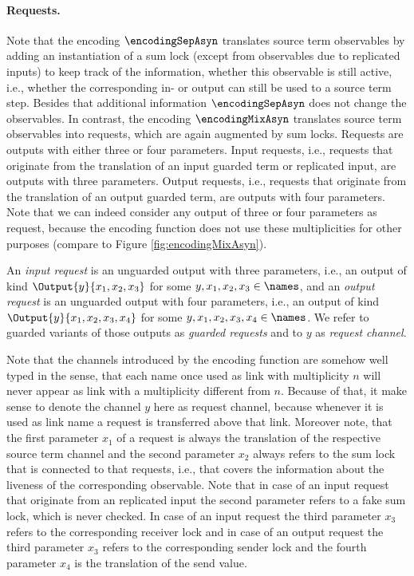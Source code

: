 \documentclass[]{llncs}
\begin{document}
\paragraph*{Requests.} Note that the encoding $ \encodingSepAsyn $ translates source term observables by adding an instantiation of a sum lock (except from observables due to replicated inputs) to keep track of the information, whether this observable is still active, i.e., whether the corresponding in- or output can still be used to \simulate a source term step. Besides that additional information $ \encodingSepAsyn $ does not change the observables. In contrast, the encoding $ \encodingMixAsyn $ translates source term observables into requests, which are again augmented by sum locks. Requests are outputs with either three or four parameters. Input requests, i.e., requests that originate from the translation of an input guarded term or replicated input, are outputs with three parameters. Output requests, i.e., requests that originate from the translation of an output guarded term, are outputs with four parameters. Note that we can indeed consider any output of three or four parameters as request, because the encoding function does not use these multiplicities for other purposes (compare to Figure \ref{fig:encodingMixAsyn}).

\begin{definition}[Request] \label{def:request}
	An \emph{input request} is an unguarded output with three parameters, i.e., an output of kind $ \Output{y}{x_1, x_2, x_3} $ for some $ y, x_1, x_2, x_3 \in \names $, and an \emph{output request} is an unguarded output with four parameters, i.e., an output of kind $ \Output{y}{x_1, x_2, x_3, x_4} $ for some $ y, x_1, x_2, x_3, x_4 \in \names $. We refer to guarded variants of those outputs as \emph{guarded requests} and to $ y $ as \emph{request channel}.
\end{definition}
\noindent
Note that the channels introduced by the encoding function are somehow well typed in the sense, that each name once used as link with multiplicity $ n $ will never appear as link with a multiplicity different from $ n $. Because of that, it make sense to denote the channel $ y $ here as request channel, because whenever it is used as link name a request is transferred above that link. Moreover note, that the first parameter $ x_1 $ of a request is always the translation of the respective source term channel and the second parameter $ x_2 $ always refers to the sum lock that is connected to that requests, i.e., that covers the information about the liveness of the corresponding observable. Note that in case of an input request that originate from an replicated input the second parameter refers to a fake sum lock, which is never checked. In case of an input request the third parameter $ x_3 $ refers to the corresponding receiver lock and in case of an output request the third parameter $ x_3 $ refers to the corresponding sender lock and the fourth parameter $ x_4 $ is the translation of the send value.
\end{document}
